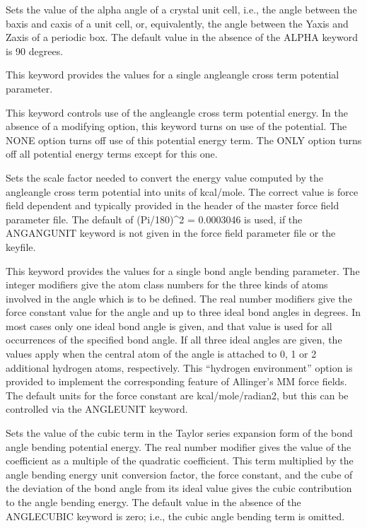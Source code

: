 \documentclass[letterpaper,11pt,english]{sphinxmanual}
\begin{document}

  Sets the value of the alpha angle of a crystal unit cell, i.e., the angle between the b\sphinxhyphen{}axis and c\sphinxhyphen{}axis of a unit cell, or, equivalently, the angle between the Y\sphinxhyphen{}axis and Z\sphinxhyphen{}axis of a periodic box. The default value in the absence of the ALPHA keyword is 90 degrees.

  This keyword provides the values for a single angle\sphinxhyphen{}angle cross term potential parameter.

  This keyword controls use of the angle\sphinxhyphen{}angle cross term potential energy. In the absence of a modifying option, this keyword turns on use of the potential. The NONE option turns off use of this potential energy term. The ONLY option turns off all potential energy terms except for this one.

  Sets the scale factor needed to convert the energy value computed by the angle\sphinxhyphen{}angle cross term potential into units of kcal/mole. The correct value is force field dependent and typically provided in the header of the master force field parameter file. The default of (Pi/180)\textasciicircum{}2 = 0.0003046 is used, if the ANGANGUNIT keyword is not given in the force field parameter file or the keyfile.


  This keyword provides the values for a single bond angle bending parameter. The integer modifiers give the atom class numbers for the three kinds of atoms involved in the angle which is to be defined. The real number modifiers give the force constant value for the angle and up to three ideal bond angles in degrees. In most cases only one ideal bond angle is given, and that value is used for all occurrences of the specified bond angle. If all three ideal angles are given, the values apply when the central atom of the angle is attached to 0, 1 or 2 additional hydrogen atoms, respectively. This “hydrogen environment” option is provided to implement the corresponding feature of Allinger’s MM force fields. The default units for the force constant are kcal/mole/radian2, but this can be controlled via the ANGLEUNIT keyword.

  Sets the value of the cubic term in the Taylor series expansion form of the bond angle bending potential energy. The real number modifier gives the value of the coefficient as a multiple of the quadratic coefficient. This term multiplied by the angle bending energy unit conversion factor, the force constant, and the cube of the deviation of the bond angle from its ideal value gives the cubic contribution to the angle bending energy. The default value in the absence of the ANGLE\sphinxhyphen{}CUBIC keyword is zero; i.e., the cubic angle bending term is omitted.
\end{document}
